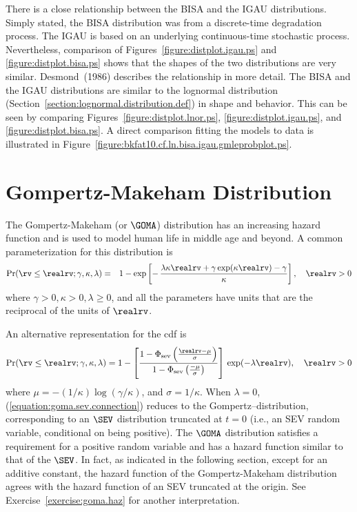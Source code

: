 There is a close relationship between the BISA and the IGAU
distributions. Simply stated, the BISA distribution was from
a discrete-time degradation process. The IGAU is based
on an underlying continuous-time stochastic process. Nevertheless,
comparison of Figures~\ref{figure:distplot.igau.ps} and 
\ref{figure:distplot.bisa.ps} shows that
the shapes of the two distributions are very similar.  Desmond~(1986)
describes the relationship in more detail.  The BISA and the IGAU
distributions are similar to the lognormal distribution
(Section~\ref{section:lognormal.distribution.def}) in shape and
behavior. This can be seen by comparing Figures~\ref{figure:distplot.lnor.ps},
\ref{figure:distplot.igau.ps}, and \ref{figure:distplot.bisa.ps}.
A direct comparison fitting the models to data is illustrated in
Figure~\ref{figure:bkfat10.cf.ln.bisa.igau.gmleprobplot.ps}.

\section{Gompertz-Makeham Distribution}
\label{section:gompertz.makeham}
The Gompertz-Makeham (or $\GOMA$) distribution has an 
increasing hazard function and is used to model human life in middle
age and beyond.  A common
parameterization for this distribution is 
\begin{eqnarray*}
\Pr(\rv \le \realrv;\gamma, \kappa, \lambda)&=& 
1-\exp \left [ -\, \frac{ \lambda \kappa \realrv +
\gamma \exp( \kappa \realrv) -\gamma } {\kappa
} \right ],
\quad \realrv > 0
\end{eqnarray*} 
where $\gamma >0, \kappa > 0, \lambda \ge 0$,
and all the parameters have units that are the reciprocal of the units of
$\realrv$.  

An alternative representation for the cdf is 
\begin{equation}
\label{equation:goma.sev.connection}
\Pr(\rv \le \realrv;\gamma, \kappa, \lambda) = 
1- 
 \left [
 \frac{
   1-\Phi_{\rm sev}
  \left  (
   \frac{\realrv-\mu}{\sigma}
  \right )
      }
      {
   1-\Phi_{\rm sev}
  \left  (
   \frac{-\mu}{\sigma}
  \right )
      }
\right ]\, \exp ( -\lambda \realrv), \quad \realrv > 0
\end{equation}
where $\mu=-(1/\kappa) \log(\gamma/\kappa)$, and $\sigma=1/\kappa$.  When
$\lambda=0$, (\ref{equation:goma.sev.connection}) reduces to the
Gompertz--distribution, corresponding to an $\SEV$ distribution
truncated at $t=0$ (i.e., an SEV random variable, conditional on
being positive). The $\GOMA$ distribution satisfies a requirement for
a positive random variable and has a hazard function similar to
that of the $\SEV$. In fact, as indicated in the following section,
except for an additive constant, the hazard function of the
Gompertz-Makeham distribution agrees with the hazard function of an
SEV truncated at the origin. See Exercise~\ref{exercise:goma.haz}
for another interpretation.

